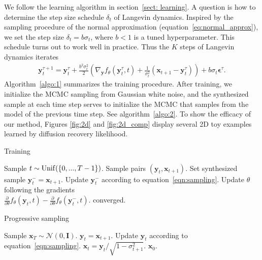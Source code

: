 \documentclass{article} \usepackage{iclr2021_conference,times}
\def\secref#1{section~\ref{#1}}
\def\eqref#1{equation~\ref{#1}}
\def\algref#1{algorithm~\ref{#1}}
\def\Algref#1{Algorithm~\ref{#1}}
\def\rvx{{\mathbf{x}}}
\def\rvy{{\mathbf{y}}}
\def\mI{{\bm{I}}}
\def\N{{\mathcal N}}
\def\beps{\bm{\epsilon}}
\begin{document}
We follow the learning algorithm in \secref{sect: learning}. A question is how to determine the step size schedule $\delta_t$ of Langevin dynamics. Inspired by the sampling procedure of the normal approximation (\eqref{eq:normal_approx}), we set the step size $\delta_t = b \sigma_t$, where $b < 1$ is a tuned hyperparameter. This schedule turns out to work well in practice. Thus the $K$ steps of Langevin dynamics iterates
\begin{eqnarray}
	\rvy^{\tau+1}_t = \rvy^{\tau}_t + \frac{b^2\sigma_t^2}{2} (\nabla_\rvy f_\theta(\rvy^\tau_t, t) + \frac{1}{\sigma_t^2} (\rvx_{t+1}-\rvy_t^\tau)) + b \sigma_t \beps^\tau. \label{eqn:sampling}
\end{eqnarray}
\Algref{algo:1} summarizes the training procedure. After training, we initialize the MCMC sampling from Gaussian white noise, and the synthesized sample at each time step serves to initialize the MCMC that samples from the model of the previous time step. See \algref{algo:2}. To show the efficacy of our method, Figures \ref{fig:2d} and \ref{fig:2d_comp} display several 2D toy examples learned by diffusion recovery likelihood. 
\vspace{-.5cm}
\begin{center}
	\begin{minipage}[c]{.45\textwidth}
	\begin{algorithm}[H]
	\caption{Training}
	\label{algo:1}	
\begin{algorithmic}
	\REPEAT
	\STATE Sample $t \sim {\rm Unif}(\{0, ..., T-1\})$.
	\STATE Sample pairs $(\rvy_{t}, \rvx_{t+1})$.
	\STATE Set synthesized sample $\rvy_t^- = \rvx_{t+1}$.
	\STATE Update $\rvy_t^-$ according to \eqref{eqn:sampling}.
	\ENDFOR
	\STATE Update $\theta$ following the gradients \\
	$\frac{\partial}{\partial \theta} f_\theta(\rvy_t, t)- \frac{\partial}{\partial \theta} f_\theta(\rvy_t^-, t)$.
	\UNTIL converged.
\end{algorithmic}
\end{algorithm}
\end{minipage}
\hspace{3mm}
\begin{minipage}[c]{.45\textwidth}
	\begin{algorithm}[H]
	\caption{Progressive sampling}
	\label{algo:2}	
\begin{algorithmic}
	\STATE Sample $\rvx_T \sim \N(0, \mI)$.
	\STATE $\rvy_t = \rvx_{t+1}$.
	\STATE Update $\rvy_t$ according to \eqref{eqn:sampling}.
	\ENDFOR
	\STATE $\rvx_t = \rvy_t / \sqrt{1 - \sigma_{t+1}^2}$.
	\ENDFOR
	\RETURN $\rvx_0$.
\end{algorithmic}
\end{algorithm}
\end{minipage}
\end{center}
\end{document}
